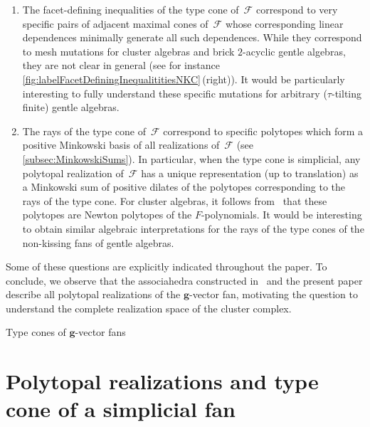 \documentclass{amsart}
\makeatletter
\theoremstyle{definition}
\renewcommand{\b}[1]{{\boldsymbol{#1}}} %
\newcommand{\Fan}{\mathcal{F}} %
\def\part{\@startsection{part}{1}%
\z@{.7\linespacing\@plus\linespacing}{.8\linespacing}%
{\LARGE\sffamily\centering}}
\makeatother
\begin{document}
\smallskip
\begin{enumerate}[$\quad\bullet$]
\item The facet-defining inequalities of the type cone of~$\Fan$ correspond to very specific pairs of adjacent maximal cones of~$\Fan$ whose corresponding linear dependences minimally generate all such dependences. While they correspond to mesh mutations for cluster algebras and brick $2$-acyclic gentle algebras, they are not clear in general (see for instance \cref{fig:labelFacetDefiningInequalititiesNKC}\,(right)). It would be particularly interesting to fully understand these specific mutations for arbitrary ($\tau$-tilting finite) gentle algebras.

\smallskip
\item The rays of the type cone of~$\Fan$ correspond to specific polytopes which form a positive Minkowski basis of all realizations of~$\Fan$ (see \cref{subsec:MinkowskiSums}). In particular, when the type cone is simplicial, any polytopal realization of~$\Fan$ has a unique representation (up to translation) as a Minkowski sum of positive dilates of the polytopes corresponding to the rays of the type cone. For cluster algebras, it follows from~\cite[Sect.~6]{BazierMatteDouvilleMousavandThomasYildirim} that these polytopes are Newton polytopes of the $F$-polynomials. It would be interesting to obtain similar algebraic interpretations for the rays of the type cones of the non-kissing fans of gentle algebras.
\end{enumerate}

\smallskip
\noindent
Some of these questions are explicitly indicated throughout the paper.
To conclude, we observe that the associahedra constructed in~\cite{ArkaniHamedBaiHeYan, BazierMatteDouvilleMousavandThomasYildirim} and the present paper describe all polytopal realizations of the $\b{g}$-vector fan, motivating the question to understand the complete realization space of the cluster complex. 


\newpage
\part{Type cones of $\b{g}$-vector fans}
\label{part:geometry}


\section{Polytopal realizations and type cone of a simplicial fan}
\label{sec:typeCone}
\end{document}
